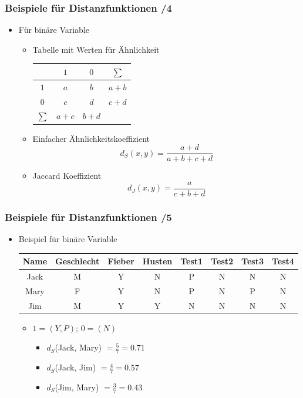 
\begin{frame}%
\frametitle{Beispiele für Distanzfunktionen /4}

\begin{itemize}
\item Für binäre Variable 
\begin{itemize}
\item Tabelle mit Werten für Ähnlichkeit 

\begin{center}
\begin{tabular}{|c||c|c|c|}
\hline
  & $1$ & $0$ & $\sum$ \\
\hline
\hline
$1$ & $a$ & $b$ & $a+b$ \\
\hline
$0$ & $c$ & $d$ & $c+d$ \\
\hline
$\sum$ & $a+c$ & $b+d$ & \\
\hline
\end{tabular}
\end{center}

\item Einfacher Ähnlichkeitskoeffizient 
$$d_S(x,y) = \frac{a+d}{a+b+c+d}$$
\item Jaccard Koeffizient 
$$d_J(x,y) = \frac{a}{c+b+d}$$
\end{itemize}
\end{itemize}

\end{frame}


\begin{frame}%
\frametitle{Beispiele für Distanzfunktionen /5}

\begin{itemize}
\item Beispiel für binäre Variable 
{\footnotesize
\begin{tabular}{|c|c|c|c|c|c|c|c|}
\hline
Name & Geschlecht & Fieber & Husten & Test1 & Test2 & Test3 & Test4 \\
\hline
Jack & M & Y & N & P & N & N & N \\
Mary & F & Y & N & P & N & P & N \\
Jim  & M & Y & Y & N & N & N & N \\
\hline
\end{tabular}}

\begin{itemize}
\item $1 = (Y,P)$; $0 = (N)$
\begin{itemize}
\item $d_S$(Jack, Mary) $= \frac{5}{7} = 0.71$
\item $d_S$(Jack, Jim) $= \frac{4}{7} = 0.57$ 
\item $d_S$(Jim, Mary) $= \frac{3}{7} = 0.43$
\end{itemize}
\end{itemize}
\end{itemize}


\end{frame}

